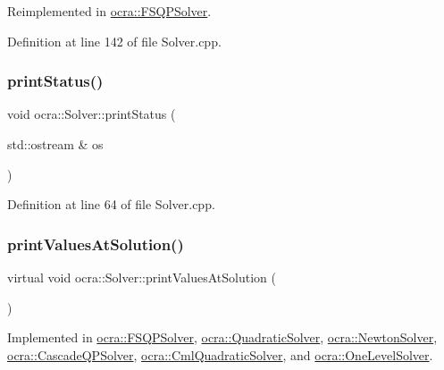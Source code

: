 Reimplemented in \hyperlink{classocra_1_1FSQPSolver_a87f59b841b1101fd552f7f9de3d3d99d}{ocra\+::\+F\+S\+Q\+P\+Solver}.



Definition at line 142 of file Solver.\+cpp.

\hypertarget{classocra_1_1Solver_a6126d57ab3704acaec99525087ced070}{}\label{classocra_1_1Solver_a6126d57ab3704acaec99525087ced070} 
\subsubsection{\texorpdfstring{print\+Status()}{printStatus()}}
{\footnotesize\ttfamily void ocra\+::\+Solver\+::print\+Status (\begin{DoxyParamCaption}\item[{std\+::ostream \&}]{os }\end{DoxyParamCaption})}



Definition at line 64 of file Solver.\+cpp.

\hypertarget{classocra_1_1Solver_ab1903098e25c16a9f92c36d37967e8fa}{}\label{classocra_1_1Solver_ab1903098e25c16a9f92c36d37967e8fa} 
\subsubsection{\texorpdfstring{print\+Values\+At\+Solution()}{printValuesAtSolution()}}
{\footnotesize\ttfamily virtual void ocra\+::\+Solver\+::print\+Values\+At\+Solution (\begin{DoxyParamCaption}{ }\end{DoxyParamCaption})\hspace{0.3cm}{\ttfamily [pure virtual]}}



Implemented in \hyperlink{classocra_1_1FSQPSolver_ad41514dc166b19fca4812b5521777f0a}{ocra\+::\+F\+S\+Q\+P\+Solver}, \hyperlink{classocra_1_1QuadraticSolver_a848c996e3a918c6cb0db3edf66c04cc1}{ocra\+::\+Quadratic\+Solver}, \hyperlink{classocra_1_1NewtonSolver_a92d33f1dfe684de2051d0389816cf9a5}{ocra\+::\+Newton\+Solver}, \hyperlink{classocra_1_1CascadeQPSolver_a1f4c5d709ce4545c596c864b1d99d08c}{ocra\+::\+Cascade\+Q\+P\+Solver}, \hyperlink{classocra_1_1CmlQuadraticSolver_aed7554d599282ef5e8a7567b73b822b8}{ocra\+::\+Cml\+Quadratic\+Solver}, and \hyperlink{classocra_1_1OneLevelSolver_a90751a818854e6b91342f209fd5a0fd2}{ocra\+::\+One\+Level\+Solver}.

